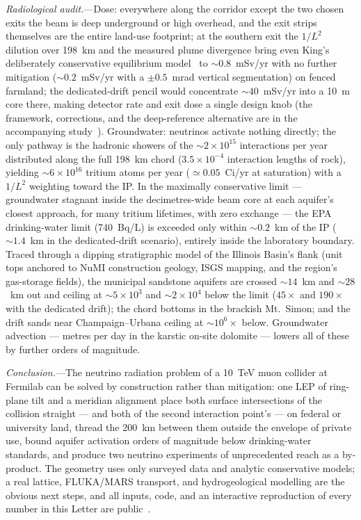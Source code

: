 \documentclass[aps,prl,reprint,superscriptaddress,nofootinbib]{revtex4-2}
\begin{document}
\emph{Radiological audit.}---Dose: everywhere along the corridor except
the two chosen exits the beam is deep underground or high overhead, and
the exit strips themselves are the entire land-use footprint; at the
southern exit the $1/L^{2}$ dilution over 198~km and the measured plume
divergence bring even King's deliberately conservative equilibrium
model~\cite{King} to ${\sim}0.8$~mSv/yr with no further mitigation
(${\sim}0.2$~mSv/yr with a $\pm0.5$~mrad vertical segmentation) on fenced
farmland; the dedicated-drift pencil would concentrate ${\sim}40$~mSv/yr
into a 10~m core there, making detector rate and exit dose a single
design knob (the framework, corrections, and the deep-reference
alternative are in the accompanying study~\cite{site}). Groundwater: neutrinos
activate nothing directly; the only pathway is the hadronic showers of
the ${\sim}2\times10^{15}$ interactions per year distributed along the
full 198~km chord ($3.5\times10^{-4}$ interaction lengths of rock),
yielding ${\sim}6\times10^{16}$ tritium atoms per year
(${\simeq}0.05$~Ci/yr at saturation) with a $1/L^{2}$ weighting toward
the IP. In the maximally conservative limit --- groundwater stagnant
inside the decimetres-wide beam core at each aquifer's closest approach,
for many tritium lifetimes, with zero exchange --- the EPA drinking-water
limit (740~Bq/L) is exceeded only within ${\sim}0.2$~km of the IP
(${\sim}1.4$~km in the dedicated-drift scenario), entirely
inside the laboratory boundary. Traced through a dipping stratigraphic
model of the Illinois Basin's flank (unit tops anchored to NuMI
construction geology, ISGS mapping, and the region's gas-storage fields),
the municipal sandstone aquifers are crossed ${\sim}14$~km and
${\sim}28$~km out and ceiling at ${\sim}5\times10^{3}$ and
${\sim}2\times10^{4}$ below the limit ($45\times$ and $190\times$ with
the dedicated drift); the chord bottoms in the brackish Mt.~Simon; and
the drift sands near Champaign--Urbana ceiling at ${\sim}10^{6}\times$
below.
Groundwater advection --- metres per day in the karstic on-site
dolomite --- lowers all of these by further orders of magnitude.

\emph{Conclusion.}---The neutrino radiation problem of a 10~TeV muon
collider at Fermilab can be solved by construction rather than
mitigation: one LEP of ring-plane tilt and a meridian alignment place
both surface intersections of the collision straight --- and both of the
second interaction point's --- on federal or university land, thread the
200~km between them outside the envelope of private use, bound aquifer
activation orders of magnitude below drinking-water standards, and
produce two neutrino experiments of unprecedented reach as a by-product.
The geometry uses only surveyed data and analytic conservative models; a
real lattice, FLUKA/MARS transport, and hydrogeological modelling are the
obvious next steps, and all inputs, code, and an interactive
reproduction of every number in this Letter are public~\cite{site}.
\end{document}
